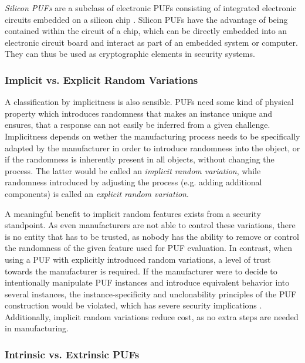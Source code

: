 \emph{Silicon PUFs} are a subclass of electronic PUFs consisting of integrated electronic circuits
embedded on a silicon chip \cite[][p. 23]{Maes2013}.
Silicon PUFs have the advantage of being contained within the circuit of a chip, which can be directly embedded
into an electronic circuit board and interact as part of an embedded system or computer.
They can thus be used as cryptographic elements in security systems. \cite[][p. 23]{Maes2013}

\subsubsection{Implicit vs. Explicit Random Variations}

A classification by implicitness is also sensible.
PUFs need some kind of physical property which introduces randomness that makes
an instance unique and ensures, that a response can not easily be inferred from a given challenge.
Implicitness depends on wether the manufacturing process needs to be specifically adapted by the manufacturer in order
to introduce randomness into the object, or if the randomness is inherently present in all objects,
without changing the process.
The latter would be called an \emph{implicit random variation}, while randomness introduced by adjusting the
process (e.g. adding additional components) is called an \emph{explicit random variation}. \cite[][p. 24]{Maes2013} \cite[][p. 3]{McGrath2019}

A meaningful benefit to implicit random features exists from a security standpoint.
As even manufacturers are not able to control these variations, there is no entity that has to
be trusted, as nobody has the ability to remove or control the randomness of the given feature used for PUF evaluation.
In contrast, when using a PUF with explicitly introduced random variations, a level of trust towards the manufacturer
is required. If the manufacturer were to decide to intentionally manipulate PUF instances and introduce
equivalent behavior into several instances, the instance-specificity and unclonability principles of the PUF construction would be violated,
which has severe security implications \cite[][p. 24]{Maes2013} \cite[][p. 3]{McGrath2019}.
Additionally, implicit random variations reduce cost, as no extra steps are needed in manufacturing. \cite[][p. 3]{McGrath2019}

\subsubsection{Intrinsic vs. Extrinsic PUFs}

